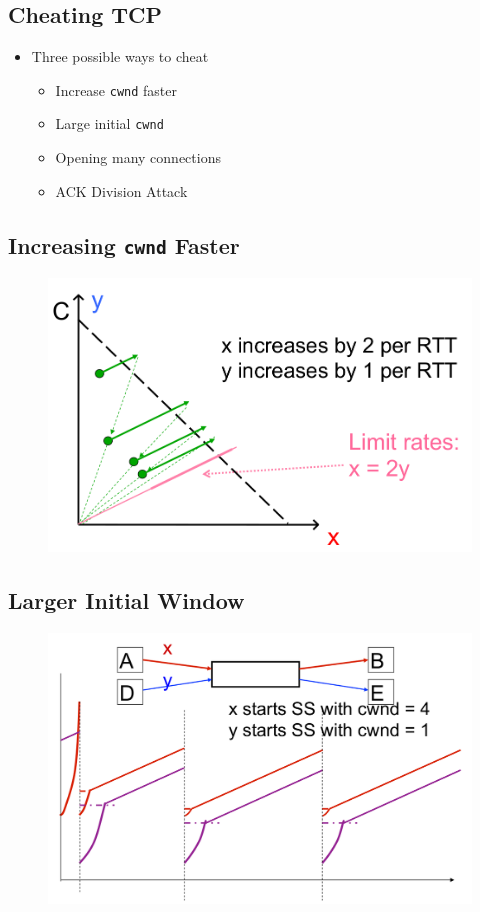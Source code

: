 \subsection{Cheating TCP}
\begin{itemize}[nosep]
    \item Three possible ways to cheat
          \begin{itemize}[nosep]
              \item Increase \texttt{cwnd} faster
              \item Large initial \texttt{cwnd}
              \item Opening many connections
              \item ACK Division Attack
          \end{itemize}
\end{itemize}
\subsection{Increasing \texttt{cwnd} Faster}
\begin{figure}[H]
    \includegraphics[width=\textwidth]{lazy/cwnd-faster.png}
\end{figure}
\subsection{Larger Initial Window}
\begin{figure}[H]
    \includegraphics[width=\textwidth]{lazy/larger-initial-window.png}
\end{figure}
